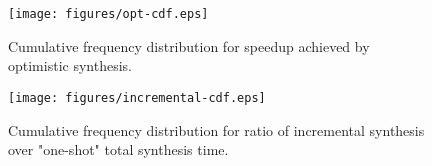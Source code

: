 %
%

\begin{figure}
	\texttt{[image: figures/opt-cdf.eps]}
	\caption{Cumulative frequency distribution for speedup achieved by optimistic synthesis.}
	\label{fig:opt-cdf}
\end{figure}
\begin{figure}
	\texttt{[image: figures/incremental-cdf.eps]}
	\caption{Cumulative frequency distribution for ratio of incremental synthesis over "one-shot" total synthesis time.}
	\label{fig:incremental-cdf}
\end{figure}




